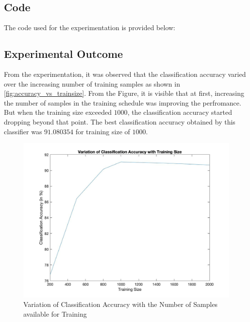 \documentclass[11pt]{article}
\begin{document}
\subsection{Code}
The code used for the experimentation is provided below:


\subsection{Experimental Outcome}
From the experimentation, it was observed that the classification accuracy varied over the increasing number of training samples as shown in \autoref{fig:accuracy_vs_trainsize}. From the Figure, it is visible that at first, increasing the number of samples in the training schedule was improving the perfromance. But when the training size exceeded $1000$, the classification accuracy started dropping beyond that point. 
The best classification accuracy obtained by this classifier was $91.080354$ for training size of $1000$.

\begin{figure}[H]
	\centering
	\begin{adjustbox}{width=0.6\paperwidth}
			\includegraphics{Codes/Results/Logistic Train/Accuracy_Variance}
	\end{adjustbox}
	\caption{Variation of Classification Accuracy with the Number of Samples available for Training}
	\label{fig:accuracy_vs_trainsize}
\end{figure}
\end{document}
